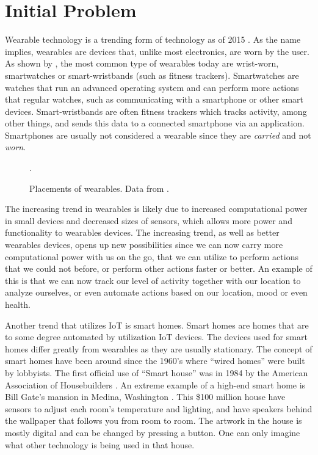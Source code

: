 \section{Initial Problem}\label{sec:initproblem}
Wearable technology is a trending form of technology as of 2015 \cite{WEARABLESTREND}. 
As the name implies, wearables are devices that, unlike most electronics, are worn by the user. 
As shown by , the most common type of wearables today are wrist-worn, 
\eg smartwatches or smart-wristbands (such as fitness trackers).
Smartwatches are watches that run an advanced operating system and can perform more actions that regular watches, 
such as communicating with a smartphone or other smart devices.
Smart-wristbands are often fitness trackers which tracks activity, among other things, 
and sends this data to a connected smartphone via an application. 
Smartphones are usually not considered a wearable since they are \emph{carried} and not \emph{worn}. 

\begin{figure}[!htb]
  \centering
  
  \caption{Placements of wearables. Data from \protect\cite{LISTOFWEARABLES}.}.
  \label{fig:wearables-placement}
\end{figure}

The increasing trend in wearables is likely due to increased computational power in small devices and decreased sizes of sensors, 
which allows more power and functionality to wearables devices. 
The increasing trend, as well as better wearables devices, 
opens up new possibilities since we can now carry more computational power with us on the go, 
that we can utilize to perform actions that we could not before, 
or perform other actions faster or better. 
An example of this is that we can now track our level of activity together with our location to analyze ourselves, 
or even automate actions based on our location, mood or even health. 

Another trend that utilizes IoT is smart homes.
Smart homes are homes that are to some degree automated by utilization IoT devices. 
The devices used for smart homes differ greatly from wearables as they are usually stationary. 
The concept of smart homes have been around since the 1960's where ``wired homes'' were built by lobbyists. The first official use of ``Smart house'' was in 1984 by the American Association of Housebuilders \cite{harper2003}.
An extreme example of a high-end smart home is Bill Gate's mansion in Medina, Washington \cite{billgatehouse}.
This \$100 million house have sensors to adjust each room's temperature and lighting, 
and have speakers behind the wallpaper that follows you from room to room. 
The artwork in the house is mostly digital and can be changed by pressing a button. 
One can only imagine what other technology is being used in that house. 

